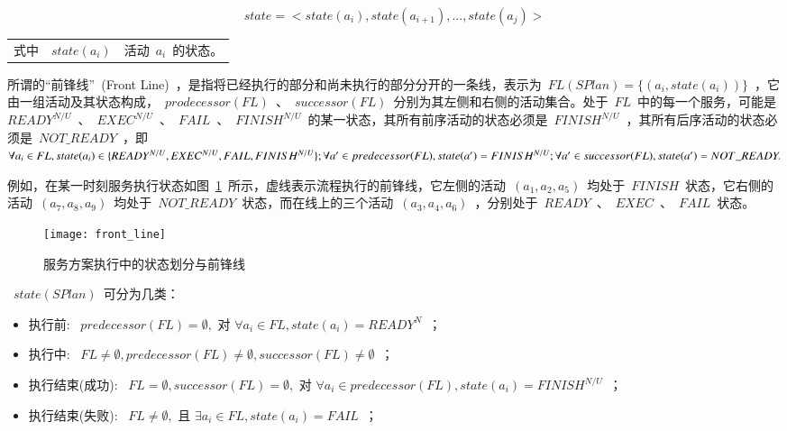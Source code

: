 \begin{equation}\label{equation:state_total}
state = < state(a_i),state(a_{i+1}),..., state(a_j)>
\end{equation}
\begin{tabularx}{\textwidth}{@{}l@{\quad}l@{\pozhehao }X@{}}
    式中
    & $state(a_i)$ & 活动~$a_i$~的状态。
\end{tabularx}\vspace{\wordsep}

所谓的“前锋线”~(Front Line)~，是指将已经执行的部分和尚未执行的部分分开的一条线，表示为~$FL(SPlan)=\{(a_i, state(a_i))\}$~，它由一组活动及其状态构成，~$prodecessor(FL)$~、~$successor(FL)$~分别为其左侧和右侧的活动集合。处于~$FL$~中的每一个服务，可能是~$READY^{N/U}$~、~$EXEC^{N/U}$~、~$FAIL$~、~$FINISH^{N/U}$~的某一状态，其所有前序活动的状态必须是~$FINISH^{N/U}$~，其所有后序活动的状态必须是~$NOT\_READY$~，即
$\forall {a_i} \in FL,state({a_i}) \in \{ READ{Y^{N/U}},{\rm{ }}EXE{C^{N/U}},{\rm{ }}FAIL,{\rm{ }}FINIS{H^{N/U}}\} ;\forall a' \in predecessor(FL),state(a') = FINIS{H^{N/U}};\forall a' \in successor(FL),state(a') = NOT\_READY.$

例如，在某一时刻服务执行状态如图~\ref{figure:front_line}~所示，虚线表示流程执行的前锋线，它左侧的活动~$(a_1, a_2, a_5)$~均处于~$FINISH$~状态，它右侧的活动~$(a_7, a_8, a_9)$~均处于~$NOT\_READY$~状态，而在线上的三个活动~$(a_3, a_4, a_6)$~，分别处于~$READY$~、~$EXEC$~、~$FAIL$~状态。

\begin{figure}[htbp]
    \centering
    \texttt{[image: front\_line]}
    \caption{服务方案执行中的状态划分与前锋线}\label{figure:front_line}
    \vspace{-1em}
\end{figure}

~$state(SPlan)$~可分为几类：
\begin{itemize}
    \item 执行前: ~$predecessor(FL) = \emptyset ,$ 对 $ \forall {a_i} \in FL,state({a_i}) = READ{Y^N}$~；
    \item 执行中: ~$FL \ne \emptyset ,predecessor(FL) \ne \emptyset ,successor(FL) \ne \emptyset $~；
    \item 执行结束(成功): ~$FL = \emptyset ,successor(FL) = \emptyset ,$ 对 $\forall {a_i} \in predecessor(FL),state({a_i}) = FINIS{H^{N/U}}$~；
    \item 执行结束(失败): ~$FL \ne \emptyset ,$ 且 $\exists {a_i} \in FL,state({a_i}) = FAIL$~；
\end{itemize}

